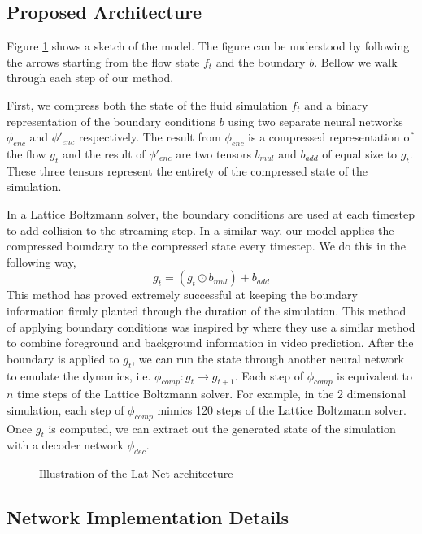 \documentclass{article}
\begin{document}
\subsection{Proposed Architecture}

Figure \ref{fig_1} shows a sketch of the model. The figure can be understood by following the arrows starting from the flow state $f_t$ and the boundary $b$. Bellow we walk through each step of our method.

First, we compress both the state of the fluid simulation $f_t$ and a binary representation of the boundary conditions $b$ using two separate neural networks $\phi_{enc}$ and $\phi'_{enc}$ respectively. The result from $\phi_{enc}$ is a compressed representation of the flow $g_t$ and the result of $\phi'_{enc}$ are two tensors $b_{mul}$ and $b_{add}$ of equal size to $g_t$. These three tensors represent the entirety of the compressed state of the simulation.

In a Lattice Boltzmann solver, the boundary conditions are used at each timestep to add collision to the streaming step. In a similar way, our model applies the compressed boundary to the compressed state every timestep. We do this in the following way,
\begin{equation}
  g_t = (g_t \odot b_{mul}) + b_{add}
\end{equation}
This method has proved extremely successful at keeping the boundary information firmly planted through the duration of the simulation. This method of applying boundary conditions was inspired by \cite{vondrick2016generating} where they use a similar method to combine foreground and background information in video prediction. After the boundary is applied to $g_t$, we can run the state through another neural network to emulate the dynamics, i.e. $\phi_{comp}:g_{t} \rightarrow g_{t+1}$. Each step of $\phi_{comp}$ is equivalent to $n$ time steps of the Lattice Boltzmann solver. For example, in the 2 dimensional simulation, each step of $\phi_{comp}$ mimics 120 steps of the Lattice Boltzmann solver. Once $g_t$ is computed, we can extract out the generated state of the simulation with a decoder network $\phi_{dec}$. 

\begin{figure}[!t]
\centering
{}
\caption{Illustration of the Lat-Net architecture}
\label{fig_1}
\end{figure}

\subsection{Network Implementation Details}
\end{document}
